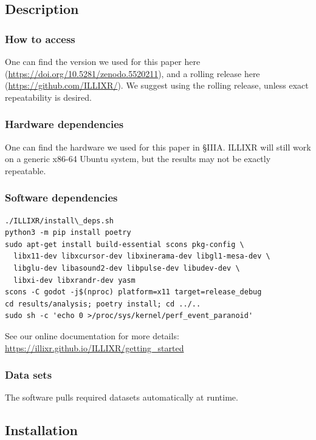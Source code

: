 \documentclass{sigplanconf}
\newcommand{\zenodo}{\footnotesize \url{https://doi.org/10.5281/zenodo.5520211}}
\begin{document}
\subsection{Description}

\subsubsection{How to access}

One can find the version we used for this paper here (\zenodo), and a rolling release here ({\footnotesize \url{https://github.com/ILLIXR/}}). We suggest using the rolling release, unless exact repeatability is desired.

\subsubsection{Hardware dependencies}

One can find the hardware we used for this paper in \S IIIA. ILLIXR will still work on a generic x86-64 Ubuntu system, but the results may not be exactly repeatable.

\subsubsection{Software dependencies}

{
\footnotesize
\begin{verbatim}
./ILLIXR/install\_deps.sh
python3 -m pip install poetry
sudo apt-get install build-essential scons pkg-config \
  libx11-dev libxcursor-dev libxinerama-dev libgl1-mesa-dev \
  libglu-dev libasound2-dev libpulse-dev libudev-dev \
  libxi-dev libxrandr-dev yasm
scons -C godot -j$(nproc) platform=x11 target=release_debug
cd results/analysis; poetry install; cd ../..
sudo sh -c 'echo 0 >/proc/sys/kernel/perf_event_paranoid'
\end{verbatim}
}

See our online documentation for more details:\newline
{\footnotesize \url{https://illixr.github.io/ILLIXR/getting_started}}

\subsubsection{Data sets}

The software pulls required datasets automatically at runtime.

\subsection{Installation}
\end{document}
